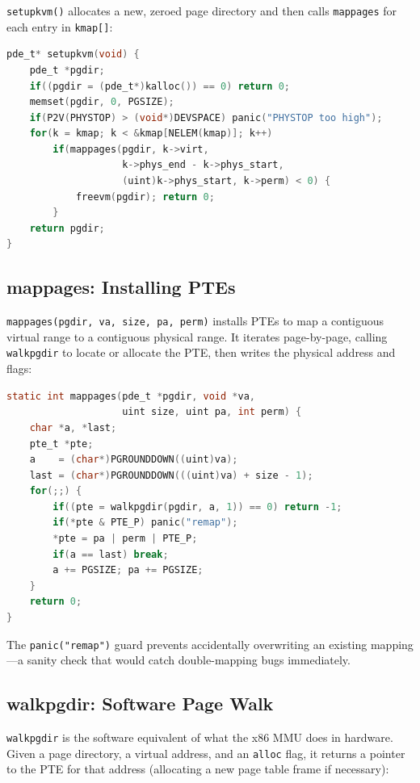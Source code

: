 \documentclass[11pt]{article}
\begin{document}
\texttt{setupkvm()} allocates a new, zeroed page directory and then calls \texttt{mappages} for each entry in \texttt{kmap[]}:

\begin{lstlisting}[language=C, caption={setupkvm() in vm.c}]
pde_t* setupkvm(void) {
    pde_t *pgdir;
    if((pgdir = (pde_t*)kalloc()) == 0) return 0;
    memset(pgdir, 0, PGSIZE);
    if(P2V(PHYSTOP) > (void*)DEVSPACE) panic("PHYSTOP too high");
    for(k = kmap; k < &kmap[NELEM(kmap)]; k++)
        if(mappages(pgdir, k->virt,
                    k->phys_end - k->phys_start,
                    (uint)k->phys_start, k->perm) < 0) {
            freevm(pgdir); return 0;
        }
    return pgdir;
}
\end{lstlisting}

\subsection{mappages: Installing PTEs}

\texttt{mappages(pgdir, va, size, pa, perm)} installs PTEs to map a contiguous virtual range to a contiguous physical range. It iterates page-by-page, calling \texttt{walkpgdir} to locate or allocate the PTE, then writes the physical address and flags:

\begin{lstlisting}[language=C, caption={mappages() in vm.c}]
static int mappages(pde_t *pgdir, void *va,
                    uint size, uint pa, int perm) {
    char *a, *last;
    pte_t *pte;
    a    = (char*)PGROUNDDOWN((uint)va);
    last = (char*)PGROUNDDOWN(((uint)va) + size - 1);
    for(;;) {
        if((pte = walkpgdir(pgdir, a, 1)) == 0) return -1;
        if(*pte & PTE_P) panic("remap");
        *pte = pa | perm | PTE_P;
        if(a == last) break;
        a += PGSIZE; pa += PGSIZE;
    }
    return 0;
}
\end{lstlisting}

The \texttt{panic("remap")} guard prevents accidentally overwriting an existing mapping---a sanity check that would catch double-mapping bugs immediately.

\subsection{walkpgdir: Software Page Walk}

\texttt{walkpgdir} is the software equivalent of what the x86 MMU does in hardware. Given a page directory, a virtual address, and an \texttt{alloc} flag, it returns a pointer to the PTE for that address (allocating a new page table frame if necessary):
\end{document}
